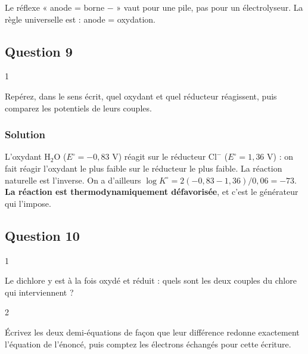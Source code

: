 \documentclass[11pt,a4paper]{article}
\begin{document}
\begin{piege}

Le réflexe « anode = borne \(-\) » vaut pour une pile, pas pour un électrolyseur. La règle universelle est : anode = oxydation.

\end{piege}

\hypertarget{question-9}{%
\subsection{Question 9}\label{question-9}}

\begin{indication}{1}

Repérez, dans le sens écrit, quel oxydant et quel réducteur réagissent, puis comparez les potentiels de leurs couples.

\end{indication}

\hypertarget{solution-8}{%
\subsubsection{Solution}\label{solution-8}}

L'oxydant \(\mathrm{H_2O}\) (\(E^\circ = -0{,}83\) V) réagit sur le réducteur \(\mathrm{Cl^-}\) (\(E^\circ = 1{,}36\) V) : on fait réagir l'oxydant le plus faible sur le réducteur le plus faible. La réaction naturelle est l'inverse. On a d'ailleurs \(\log K^\circ = 2(-0{,}83 - 1{,}36)/0{,}06 = -73\). \textbf{La réaction est thermodynamiquement défavorisée}, et c'est le générateur qui l'impose.

\hypertarget{question-10}{%
\subsection{Question 10}\label{question-10}}

\begin{indication}{1}

Le dichlore y est à la fois oxydé et réduit : quels sont les deux couples du chlore qui interviennent ?

\end{indication}

\begin{indication}{2}

Écrivez les deux demi-équations de façon que leur différence redonne exactement l'équation de l'énoncé, puis comptez les électrons échangés pour cette écriture.

\end{indication}
\end{document}
